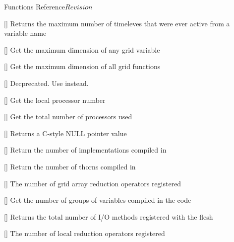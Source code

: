 \begin{cactuspart}{ Functions Reference}{}{$Revision$}
\begin{Lentry}
\item[\code{CCTK\_MaxActiveTimeLevelsVN}] [\pageref{CCTK-MaxActiveTimeLevels}]
  Returns the maximum number of timeleves that were ever active from a variable name

\item[\code{CCTK\_MaxDim}] [\pageref{CCTK-MaxDim}]
  Get the maximum dimension of any grid variable

\item[\code{CCTK\_MaxGFDim}] [\pageref{CCTK-MaxGFDim}]
  Get the maximum dimension of all grid functions

\item[\code{CCTK\_MaxTimeLevels}] [\pageref{CCTK-MaxTimeLevels}]
  Decprecated. Use  instead.

\item[\code{CCTK\_MyProc}] [\pageref{CCTK-MyProc}]
  Get the local processor number

\item[\code{CCTK\_nProcs}] [\pageref{CCTK-nProcs}]
  Get the total number of processors used

\item[\code{CCTK\_NullPointer}] [\pageref{CCTK-NullPointer}]
  Returns a C-style NULL pointer value

\item[\code{CCTK\_NumCompiledImplementations}]
  [\pageref{CCTK-NumCompiledImplementations}]
  Return the number of implementations compiled in

\item[\code{CCTK\_NumCompiledThorns}] [\pageref{CCTK-NumCompiledThorns}]
  Return the number of thorns compiled in

\item[\code{CCTK\_NumGridArrayReductionOperators}] [\pageref{CCTK-NumGridArrayReductionOperators}]
  The number of grid array reduction operators registered

\item[\code{CCTK\_NumGroups}] [\pageref{CCTK-NumGroups}]
  Get the number of groups of variables compiled in the code

\item[\code{CCTK\_NumIOMethods}] [\pageref{CCTK-NumIOMethods}]
  Returns the total number of I/O methods registered with the flesh

\item[\code{CCTK\_NumLocalArrayReduceOperators}] [\pageref{CCTK-NumLocalArrayReduceOperators}]
  The number of local reduction operators registered


\end{Lentry}
\end{cactuspart}
